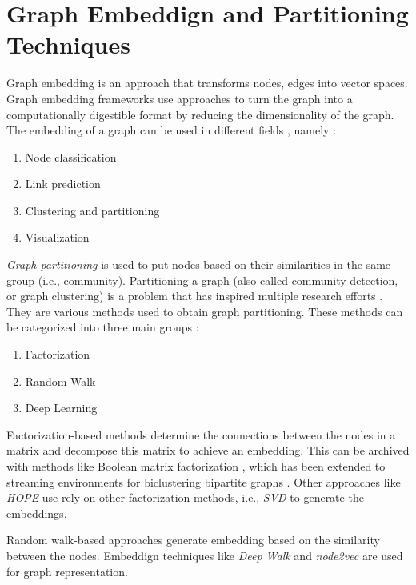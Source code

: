 \section{Graph Embeddign and Partitioning Techniques}
\label{sec:graph-partitioning-techniques}
Graph embedding is an approach that transforms nodes, edges into vector spaces. Graph embedding frameworks use approaches to turn the graph into a computationally digestible format by reducing the dimensionality of the graph. The embedding of a graph can be used in different fields \cite{goyal2018graph}, namely : 

\begin{enumerate}
    \item Node classification
    \item Link prediction
    \item Clustering and partitioning
    \item Visualization
\end{enumerate}


\emph{Graph partitioning} is used to put nodes based on their similarities in the same group (i.e., community). Partitioning a graph (also called community detection, or graph clustering) is a problem that has inspired multiple research efforts \cite{fortunato2010community}. They are various methods used to obtain graph partitioning. These methods can be categorized into three main groups \cite{goyal2018graph}:

\begin{enumerate}
    \item Factorization
    \item Random Walk
    \item Deep Learning
\end{enumerate}


Factorization-based methods determine the connections between the nodes in a matrix and decompose this matrix to achieve an embedding. This can be archived with methods like Boolean matrix factorization \cite{miettinen2011model}, which has been extended to streaming environments for biclustering bipartite graphs \cite{neumann2020biclustering}. Other approaches like \emph{HOPE} \cite{ou2016asymmetric} use rely on other factorization methods, i.e., \emph{SVD} \cite{van1976generalizing} to generate the embeddings.


Random walk-based approaches generate embedding based on the similarity between the nodes. Embeddign techniques like \emph{Deep Walk} \cite{perozzi2014deepwalk} and \emph{node2vec} \cite{grover2016node2vec} are used for graph representation.


